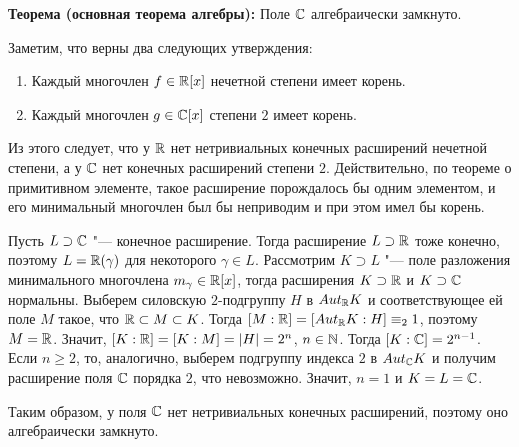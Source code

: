 \par \textbf{Теорема (основная теорема алгебры):} Поле $\mathbb{C}$ алгебраически замкнуто.
\par \Proof Заметим, что верны два следующих утверждения:
\begin{enumerate}
	\item Каждый многочлен $f \in \mathbb{R}[x]$ нечетной степени имеет корень.
	\item Каждый многочлен $g \in \mathbb{C}[x]$ степени $2$ имеет корень.
\end{enumerate}

\par Из этого следует, что у $\mathbb{R}$ нет нетривиальных конечных расширений нечетной степени, а у $\mathbb{C}$ нет конечных расширений степени $2$. Действительно, по теореме о примитивном элементе, такое расширение порождалось бы одним элементом, и его минимальный многочлен был бы неприводим и при этом имел бы корень.

\par Пусть $L \supset \mathbb{C}$ "--- конечное расширение. Тогда расширение $L \supset \mathbb{R}$ тоже конечно, поэтому $L = \mathbb{R}(\gamma)$ для некоторого $\gamma \in L$. Рассмотрим $K \supset L$ "--- поле разложения минимального многочлена $m_\gamma \in \mathbb{R}[x]$, тогда расширения $K \supset\mathbb{R}$ и $K \supset \mathbb{C}$ нормальны. Выберем силовскую $2$-подгруппу $H$ в $Aut_{\mathbb{R}}K$ и соответствующее ей поле $M$ такое, что $\mathbb{R} \subset M \subset K$. Тогда $[M : \mathbb{R}] = [Aut_{\mathbb{R}}K : H] \equiv_2 1$, поэтому $M = \mathbb{R}$. Значит, $[K : \mathbb{R}] = [K : M] = |H| = 2^n$, $n \in \mathbb{N}$. Тогда $[K : \mathbb{C}] = 2^{n - 1}$. Если $n \ge 2$, то, аналогично, выберем подгруппу индекса $2$ в $Aut_{\mathbb{C}}K$ и получим расширение поля $\mathbb{C}$ порядка $2$, что невозможно. Значит, $n = 1$ и $K = L = \mathbb{C}$.

\par Таким образом, у поля $\mathbb{C}$ нет нетривиальных конечных расширений, поэтому оно алгебраически замкнуто. \EndProof